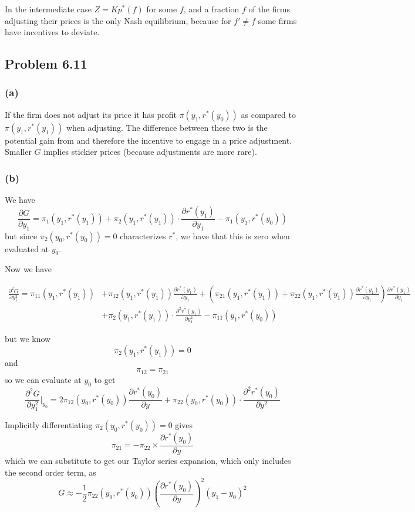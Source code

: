 \documentclass[11pt]{amsart}
\begin{document}
	In the intermediate case $Z = K p^{*} (f)$ for some $f$, and a fraction $f$ of the firms adjusting their prices is the only Nash equilibrium, because for $f' \neq f$ some firms have incentives to deviate. 

\subsection{Problem 6.11}

\subsubsection*{(a)}
If the firm does not adjust its price it has profit $\pi \left( y_1, r^{*}(y_0)  \right)$ as compared to $\pi \left( y_1, r^{*}(y_1)  \right)$ when adjusting. 
The difference between these two is the potential gain from and therefore the incentive to engage in a price adjustment.
Smaller $G$ implies stickier prices (because adjustments are more rare). 

\subsubsection*{(b)}

We have
\[
\frac{\partial G}{\partial y_1} = \pi_1(y_1, r^*(y_1)) + \pi_2(y_1, r^*(y_1)) \cdot \frac{\partial r^*(y_1)}{\partial y_1} - \pi_1(y_1, r^*(y_0))
\]
but since $\pi_2(y_0, r^*(y_0)) = 0$ characterizes $r^*$, we have that this is zero when evaluated at $y_0$.

Now we have
\begin{tiny}
\begin{align*}
\frac{\partial^2 G}{\partial y_1^2} = \pi_{11}(y_1, r^*(y_1))  &+ \pi_{12}(y_1, r^*(y_1)) \frac{\partial r^*(y_1)}{\partial y_1} + \left(\pi_{21}(y_1, r^*(y_1)) + \pi_{22}(y_1, r^*(y_1)) \frac{\partial r^*(y_1)}{\partial y_1} \right) \frac{\partial r^*(y_1)}{\partial y_1} \\&+ \pi_2(y_1, r^*(y_1)) \cdot \frac{\partial^2 r^*(y_1)}{\partial y_1^2} - \pi_11(y_1, r^*(y_0))
\end{align*}
\end{tiny}
but we know
\[
\pi_2(y_1, r^*(y_1)) = 0
\]
and 
\[
\pi_{12} = \pi_{21}
\]
so we can evaluate at $y_0$ to get
\[
\frac{\partial^2 G}{\partial y_1^2} \vert_{y_0} = 2 \pi_{12}(y_0, r^*(y_0)) \frac{\partial r^*(y_0)}{\partial y} + \pi_{22}(y_0, r^*(y_0)) \cdot \frac{\partial^2 r^*(y_0)}{\partial y^2}
\]

Implicitly differentiating $\pi_2(y_0, r^*(y_0)) = 0$ gives 
\[
\pi_{21} = - \pi_22 \times \frac{\partial r^*(y_0)}{\partial y}
\]
which we can substitute to get our Taylor series expansion, which only includes the second order term, as
\[
G \approx - \frac{1}{2} \pi_{22}(y_0, r^*(y_0)) \left(\frac{\partial r^*(y_0)}{\partial y}\right)^2 (y_1-y_0)^2
\]
\end{document}
